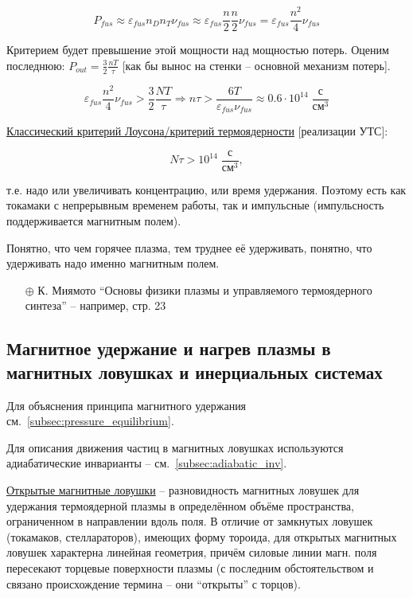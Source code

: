 \documentclass[10pt, a4paper]{article}
\begin{document}
\begin{equation*}
	P_{fus} \approx \varepsilon_{fus}n_D n_T \nu_{fus} \approx \varepsilon_{fus}\frac{n}{2} \frac{n}{2} \nu_{fus} = \varepsilon_{fus}\frac{n^2}{4} \nu_{fus}
\end{equation*}

Критерием будет превышение этой мощности над мощностью потерь. Оценим последнюю: $P_{out} = \frac{3}{2}\frac{nT}{\tau}$ [как бы вынос на стенки -- основной механизм потерь].

\begin{equation*}
	\varepsilon_{fus}\frac{n^2}{4} \nu_{fus} > \frac{3}{2}\frac{NT}{\tau} \Rightarrow n\tau > \frac{6T}{\varepsilon_{fus}\nu_{fus}}\approx 0.6\cdot 10^{14}\;\frac{\text{с}}{\text{см}^3}
\end{equation*}

\uline{Классический критерий Лоусона/критерий термоядерности} [реализации УТС]: 

\begin{equation*}
	N\tau>10^{14}\;\frac{\text{с}}{\text{см}^3},
\end{equation*}

т.е. надо или увеличивать концентрацию, или время удержания. Поэтому есть как токамаки с непрерывным временем работы, так и импульсные (импульсность поддерживается магнитным полем).

Понятно, что чем горячее плазма, тем труднее её удерживать, понятно, что удерживать надо именно магнитным полем.

\begin{itemize}
	\item[$\oplus$] К. Миямото ``Основы физики плазмы и управляемого термоядерного синтеза'' -- например, стр. 23
\end{itemize}

\subsection{Магнитное удержание и нагрев плазмы в магнитных ловушках и инерциальных системах}

Для объяснения принципа магнитного удержания см.~\ref{subsec:pressure_equilibrium}.

Для описания движения частиц в магнитных ловушках используются адиабатические инварианты -- см.~\ref{subsec:adiabatic_inv}.

\uline{Открытые магнитные ловушки} -- разновидность магнитных ловушек для удержания термоядерной плазмы в определённом объёме пространства, ограниченном в направлении вдоль поля. В отличие от замкнутых ловушек (токамаков, стеллараторов), имеющих форму тороида, для открытых магнитных ловушек характерна линейная геометрия, причём силовые линии магн. поля пересекают торцевые поверхности плазмы (с последним обстоятельством и связано происхождение термина -- они ``открыты'' с торцов).
\end{document}
